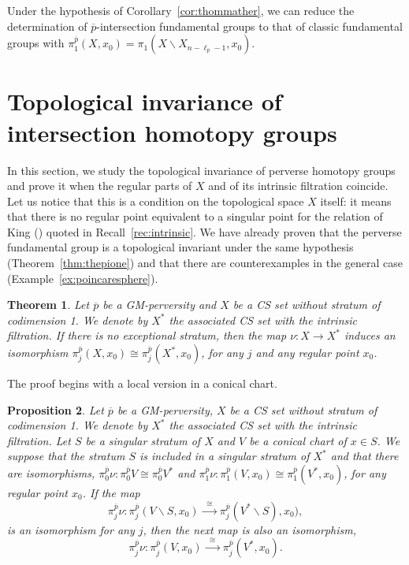 \documentclass[a4paper,10pt,english,reqno]{amsart}
\theoremstyle{plain}
\newtheorem{proposition}{Proposition}[section]
\newtheorem{theoremb}[proposition]{Theorem}
\theoremstyle{definition}
\theoremstyle{remark}
\numberwithin{equation}{section}
\newcommand{\thmref}[1]{Theorem~\ref{#1}}
\newcommand{\corref}[1]{Corollary~\ref{#1}}
\newcommand{\exemref}[1]{Example~\ref{#1}}
\def\ov{\overline}
\def\menos{\backslash}
\renewcommand\1{\hbox{\ding{192}}}
\renewcommand\2{\hbox{\ding{193}}}
\newcommand\3{\hbox{\ding{194}}}
\newcommand\4{\hbox{\ding{195}}}
\begin{document}
Under the hypothesis of \corref{cor:thommather}, we can reduce  
the determination of  $\ov{p}$-intersection fundamental groups to that of classic fundamental groups with
$\pi_{1}^{\ov{p}}(X,x_{0})=\pi_{1}(X \menos X_{n-\ell_{\ov p}-1},x_{0})$.


\section{Topological invariance of intersection homotopy groups}\label{sec:invariance}

%
In this section, we study the topological invariance of perverse homotopy groups and prove it 
when the regular parts of $X$ and of its intrinsic filtration coincide.
Let us notice that this is a condition on the topological space $X$ itself: 
it means that there is no regular point equivalent to a singular point for the relation of King
(\cite{MR800845}) quoted in Recall~\ref{rec:intrinsic}.
%
We have already proven that the perverse fundamental group is a topological invariant under the same hypothesis (\thmref{thm:thepione}) and
that there are counterexamples in the general case (\exemref{ex:poincaresphere}).

\begin{theoremb}\label{thm:homotopyinvariance}
Let $\ov{p}$ be a GM-perversity  and $X$ be a CS set without  stratum of codimension 1. 
We denote by  $X^*$  the associated CS set  with the intrinsic filtration.
%
If there is no exceptional stratum, then
% 
%
the map $\nu\colon X\to X^*$ induces an isomorphism
$\pi_{j}^{\ov{p}}(X,x_{0})\cong \pi_{j}^{\ov{p}}(X^*,x_{0})$,
for any $j$ and any regular point $x_{0}$.
\end{theoremb}

The proof begins with a local version in a conical chart.

\begin{proposition}\label{prop:invarianceopensubsetnew}
Let $\ov{p}$ be a GM-perversity, $X$ be a  CS set 
without stratum of codimension 1.
We denote by $X^*$  the associated CS set  with the intrinsic filtration.
%
Let $S$ be a singular stratum of $X$ and $V$ be a conical chart of $x\in S$. 
We suppose that the stratum $S$ is included in a singular stratum of $X^*$
and that there are isomorphisms,
$\pi_{0}^{\ov{p}}\nu\colon \pi_{0}^{\ov{p}}V\cong  \pi_{0}^{\ov{p}}V^*$
and
$\pi_{1}^{\ov{p}}\nu\colon \pi_{1}^{\ov{p}}(V,x_{0}){\cong}  \pi_{1}^{\ov{p}}(V^*,x_{0})$, 
for any regular point $x_{0}$.
If the map
\begin{equation}\label{equa:hypinvariancenew}
\pi_{j}^{\ov{p}}\nu\colon \pi_{j}^{\ov{p}}(V\menos S,x_{0})\xrightarrow{\;\;\cong\;\;} \pi_{j}^{\ov{p}}(V^*\menos S),x_{0}),
\end{equation}
is an isomorphism for any $j$, then the next map is also an isomorphism,
% 
\begin{equation}\label{equa:conclusioninvariancenew}
\pi_{j}^{\ov{p}}\nu\colon \pi_{j}^{\ov{p}}(V,x_{0})\xrightarrow{\;\;\cong\;\;}  \pi_{j}^{\ov{p}}(V^*,x_{0}).
\end{equation}
%
\end{proposition}
\end{document}
